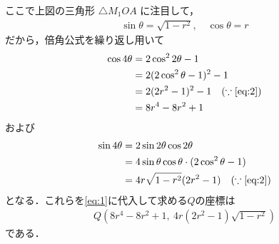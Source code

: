 \documentclass[../../main.tex]{subfiles}
\begin{document}
ここで上図の三角形 $\triangle M_1OA$ に注目して，
\begin{align}
  \sin\theta=\sqrt{1-r^2}, \quad \cos\theta=r \label{eq:2}
\end{align}
だから，倍角公式を繰り返し用いて
\begin{align}
  \cos4\theta
  &=2\cos^22\theta-1 \\
  &=2(2\cos^2\theta-1)^2-1 \\
  &=2(2r^2-1)^2-1 \quad (\because \text{\cref{eq:2}} ) \\
  &= 8r^4-8r^2+1
\end{align}
および
\begin{align}
  \sin4\theta
  &=2\sin2\theta\cos2\theta \\
  &=4\sin\theta\cos\theta\cdot(2\cos^2\theta-1) \\
  &=4r\sqrt{1-r^2}(2r^2-1) \quad (\because \text{\cref{eq:2}} )
\end{align}
となる．これらを\cref{eq:1}に代入して求める$Q$の座標は
\begin{align}
  Q\left(8r^4-8r^2+1,\ 4r(2r^2-1)\sqrt{1-r^2}\right)
\end{align}
である．

\newpage
\end{document}
